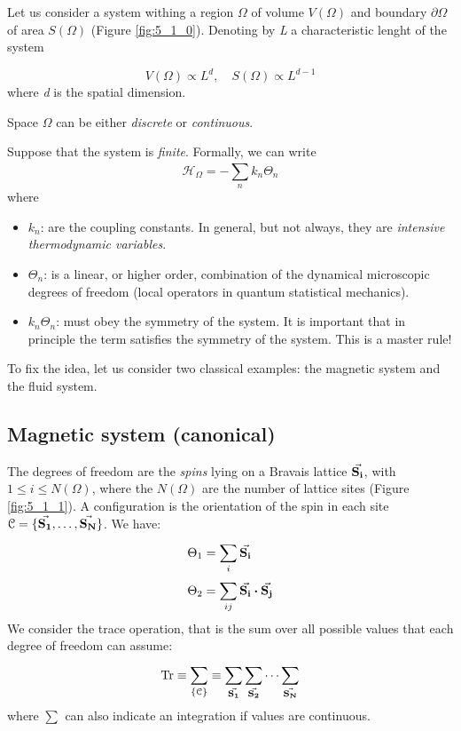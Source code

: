 \documentclass[../main/main.tex]{subfiles}
\begin{document}
Let us consider a system withing a region \( \Omega  \) of volume \( V(\Omega ) \) and boundary \( \partial{\Omega }  \)    of area \( S (\Omega ) \) (Figure \ref{fig:5_1_0}). Denoting by \emph{L} a characteristic lenght of the system

\begin{equation*}
  V(\Omega ) \propto L^d, \quad S(\Omega  ) \propto L^{d-1}
\end{equation*}
where \emph{d} is the spatial dimension.
\begin{remark}
Space \( \Omega  \) can be either \emph{discrete} or \emph{continuous}.
\end{remark}
Suppose that the system is \emph{finite}. Formally, we can write
\begin{equation}
  \mathcal{H}_{\Omega } = - \sum_{n}^{} k_n \Theta _n
\end{equation}
where
\begin{itemize}
  \item \( k_n \): are the coupling constants. In general, but not always, they are  \emph{intensive thermodynamic variables}.
  \item \( \Theta _n \): is a linear, or higher order, combination of the dynamical microscopic degrees of freedom (local operators in quantum statistical mechanics).
  \item \( k_n \Theta _n \): must obey the symmetry of the system. It is important that in principle the term satisfies the symmetry of the system. This is a master rule!
\end{itemize}
To fix the idea, let us consider two classical examples: the magnetic system and the fluid system.

\subsection{Magnetic system (canonical)}
The degrees of freedom are the \emph{spins} lying on a Bravais lattice \( \va{S_i}  \), with \( 1 \le i \le N(\Omega ) \), where the \( N(\Omega )   \) are the number of lattice sites (Figure \ref{fig:5_1_1}). A configuration is the orientation of the spin in each site \( \mathcal{C} = \{ \va{S_1},\dots,\va{S_N} \}  \).
We have:
\begin{subequations}
\begin{align}
  \Theta _1 &=  \sum_{i}^{} \va{S_i} \\
  \Theta _2 &= \sum_{ij}^{} \va{S_i} \vdot \va{S_j}
\end{align}
\end{subequations}
We consider the trace operation, that is the sum over all possible values that each degree of freedom can assume:
\begin{equation}
  \Tr \equiv \sum_{\{ \mathcal{C} \}  }^{}  \equiv \sum_{\va{S_1} }^{} \sum_{\va{S_2} }^{} \dots  \sum_{\va{S_N} }^{}
\end{equation}
where \( \sum_{}^{}   \) can also indicate an integration if values are continuous.
\end{document}
